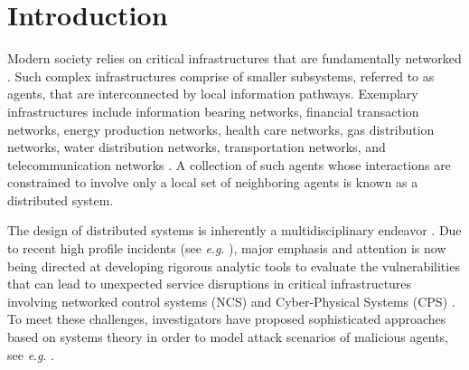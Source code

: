 \documentclass[reqno,8pt]{amsart}
\theoremstyle{definition}
\theoremstyle{remark}
\numberwithin{equation}{section}
\newcommand{\eg}{\textit{e}.\textit{g}. }
\begin{document}
\maketitle

\section{Introduction}
Modern society relies on critical infrastructures that are fundamentally networked \cite{teixeira_secure_2015-1,Pas2015}. Such complex infrastructures comprise of smaller subsystems, referred to as agents, that are interconnected by local information pathways.  Exemplary infrastructures include information bearing networks, financial transaction networks, energy production networks, health care networks, gas distribution networks, water distribution networks, transportation networks, and telecommunication networks \cite{guo_optimal_2016,pasqualetti_time-varying_2017,leong_network_2016,leong_network_2014}. A collection of such agents whose interactions are constrained to involve only a local set of neighboring agents is known as a distributed system.    


\medskip

The design of distributed systems is inherently a multidisciplinary endeavor \cite{teixeira_PhD,PasPhd2012, cardenas_research_2008}.  Due to recent high profile incidents (see \eg \cite{fichtner_cybersecurity_2016,WHNYT2015,lipton_perfect_2016,gorman_electricity_2009}), major emphasis and attention is now being directed at developing rigorous analytic tools to evaluate the vulnerabilities that can lead to unexpected service disruptions in critical infrastructures involving networked control systems (NCS) and Cyber-Physical Systems (CPS) \cite{teixeira_secure_2015,pasqualetti_attack_2013,teixeira_attack_2012,pasqualetti_design_2015,sou_detection_2012,pasqualetti_consensus_2012,teixeira_strategic_2015,sadamoto_weak_2016,park_when_2016,guo_worst-case_2016,Nazari2016}. To meet these challenges, investigators have proposed sophisticated approaches based on systems theory in order to model attack scenarios of malicious agents, see \eg \cite{teixeira_secure_2015,teixeira_secure_2015-1,tarraf_quantifying_2013,teixeira_attack_2012,pasqualetti_control-theoretic_2015,teixeira_PhD,PasPhd2012}. 
\end{document}
